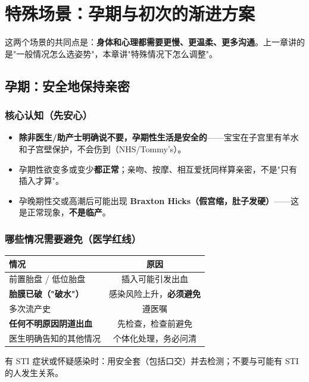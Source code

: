 \documentclass[12pt,UTF8,openany]{ctexbook}
\begin{document}
\chapter{特殊场景：孕期与初次的渐进方案}

这两个场景的共同点是：\textbf{身体和心理都需要更慢、更温柔、更多沟通}。上一章讲的是"一般情况怎么选姿势"，本章讲"特殊情况下怎么调整"。

\section{孕期：安全地保持亲密}

\subsection{核心认知（先安心）}

\begin{itemize}[leftmargin=2em,itemsep=0.3em]
  \item \textbf{除非医生/助产士明确说不要，孕期性生活是安全的}——宝宝在子宫里有羊水和子宫壁保护，不会伤到（NHS/Tommy's）。
  \item 孕期性欲变多或变少\textbf{都正常}；亲吻、按摩、相互爱抚同样算亲密，不是"只有插入才算"。
  \item 孕晚期性交或高潮后可能出现 \textbf{Braxton Hicks（假宫缩，肚子发硬）}——这是正常现象，\textbf{不是临产}。
\end{itemize}

\subsection{哪些情况需要避免（医学红线）}

\begin{tabularx}{\linewidth}{X C}
\toprule
\textbf{情况} & \textbf{原因} \\
\midrule
前置胎盘 / 低位胎盘 & 插入可能引发出血 \\
\textbf{胎膜已破（"破水"）} & 感染风险上升，\textbf{必须避免} \\
多次流产史 & 遵医嘱 \\
\textbf{任何不明原因阴道出血} & 先检查，检查前避免 \\
医生明确告知的其他情况 & 个体化处理，务必问清 \\
\bottomrule
\end{tabularx}

\vspace{0.5em}
\noindent 有 STI 症状或怀疑感染时：用安全套（包括口交）并去检测；不要与可能有 STI 的人发生关系。
\end{document}
